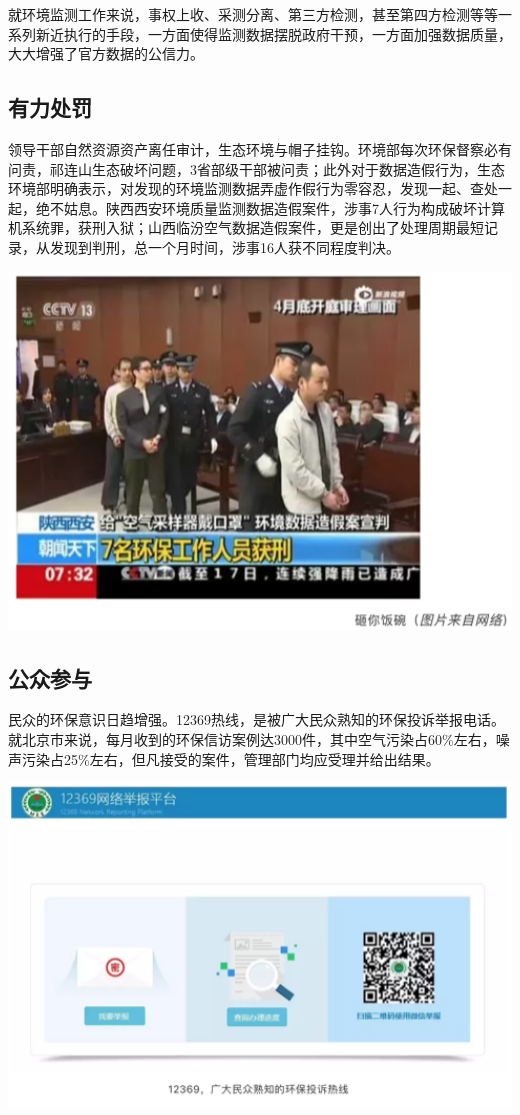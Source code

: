\documentclass[
]{book}
\begin{document}
就环境监测工作来说，事权上收、采测分离、第三方检测，甚至第四方检测等等一系列新近执行的手段，一方面使得监测数据摆脱政府干预，一方面加强数据质量，大大增强了官方数据的公信力。

\hypertarget{ux6709ux529bux5904ux7f5a}{%
\subsection{有力处罚}\label{ux6709ux529bux5904ux7f5a}}

领导干部自然资源资产离任审计，生态环境与帽子挂钩。环境部每次环保督察必有问责，祁连山生态破坏问题，3省部级干部被问责；此外对于数据造假行为，生态环境部明确表示，对发现的环境监测数据弄虚作假行为零容忍，发现一起、查处一起，绝不姑息。陕西西安环境质量监测数据造假案件，涉事7人行为构成破坏计算机系统罪，获刑入狱；山西临汾空气数据造假案件，更是创出了处理周期最短记录，从发现到判刑，总一个月时间，涉事16人获不同程度判决。

\includegraphics[width=6.67in]{images/fw4}

\hypertarget{ux516cux4f17ux53c2ux4e0e}{%
\subsection{公众参与}\label{ux516cux4f17ux53c2ux4e0e}}

民众的环保意识日趋增强。12369热线，是被广大民众熟知的环保投诉举报电话。就北京市来说，每月收到的环保信访案例达3000件，其中空气污染占60\%左右，噪声污染占25\%左右，但凡接受的案件，管理部门均应受理并给出结果。

\includegraphics[width=6.67in]{images/fw5}
\end{document}
